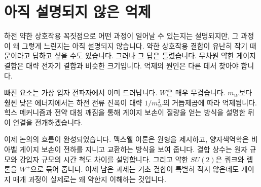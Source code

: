 \section{아직 설명되지 않은 억제}

하전 약한 상호작용 꼭짓점으로 어떤 과정이 일어날 수 있는지는 설명되지만, 그 과정이 왜 그렇게 느린지는 아직 설명되지 않습니다. 약한 상호작용 결합이 유난히 작기 때문이라고 답하고 싶을 수도 있습니다. 그러나 그 답은 틀렸습니다. 무차원 약한 게이지 결합은 대략 전자기 결합과 비슷한 크기입니다. 억제의 원인은 다른 데서 찾아야 합니다.

빠진 요소는 가상 입자 전파자에서 이미 드러납니다. \(W\)은 매우 무겁습니다. \(m_W\)보다 훨씬 낮은 에너지에서는 하전 전류 진폭이 대략 \(1/m_W^2\)의 거듭제곱에 따라 억제됩니다. 힉스 메커니즘과 전약 대칭 깨짐을 통해 게이지 보손이 질량을 얻는 방식을 설명한 뒤 이 연결을 전개하겠습니다.

\begin{classroomqa}
\end{classroomqa}

이제 논의의 흐름이 완성되었습니다. 맥스웰 이론은 원형을 제시하고, 양자색역학은 비아벨 게이지 보손이 전하를 지니고 교환하는 방식을 보여 줍니다. 결합 상수는 원자 규모와 강입자 규모의 시간 척도 차이를 설명합니다. 그리고 약한 \(SU(2)\)은 쿼크와 렙톤을 \(W^\pm\)으로 묶어 줍니다. 이제 남은 과제는 기초 결합이 특별히 작지 않은데도 게이지 매개 과정이 실제로는 왜 약한지 이해하는 것입니다.